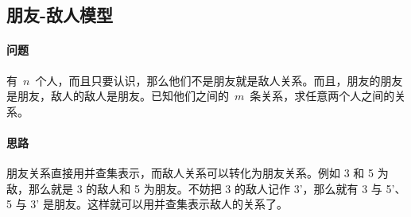 \subsection{朋友-敌人模型}
	\paragraph{问题} 有~$n$~个人，而且只要认识，那么他们不是朋友就是敌人关系。而且，朋友的朋友是朋友，敌人的敌人是朋友。已知他们之间的~$m$~条关系，求任意两个人之间的关系。
	
	\paragraph{思路} 朋友关系直接用并查集表示，而敌人关系可以转化为朋友关系。例如 3 和 5 为敌，那么就是 3 的敌人和 5 为朋友。不妨把 3 的敌人记作 3'，那么就有 3 与 5'、5 与 3' 是朋友。这样就可以用并查集表示敌人的关系了。
